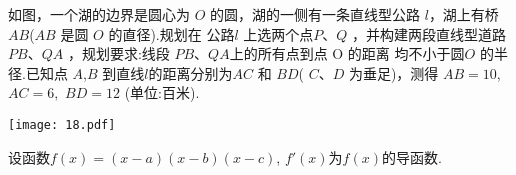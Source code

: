 \documentclass[no-math,twoside]{exam}  %
\newcommand\set[1]{\left\{\rule{0cm}{1.7ex} {#1} \right\}}
\begin{document}
\begin{questions}
{{\vfill


{

\begin{minipage}[t]{0.65\textwidth}
\linespread{1.4}\selectfont	
 	{\CTEXindent
	如图，一个湖的边界是圆心为 $O$ 的圆，湖的一侧有一条直线型公路 $l $，湖上有桥 $AB$($AB$ 是圆 $O$ 的直径).规划在 公路$ l$ 上选两个点$ P$、$Q$ ，并构建两段直线型道路 $PB$、$QA$ ，规划要求:线段 $PB$、$QA $上的所有点到点 O 的距离 均不小于圆$ O$ 的半径.已知点 $A$,$B$ 到直线$ l $的距离分别为$ AC$ 和 $BD $( $C$、$D$ 为垂足)，测得
$AB = 10$, $AC = 6,$ $BD = 12$ (单位:百米).

	}
\end{minipage} \quad
\begin{minipage}[t]{0.35\textwidth}
\vspace{-8pt}
	{\texttt{[image: 18.pdf]}}%
\end{minipage}


\vfill


\newpage

	
	{\CTEXindent
	设函数$f(x)=(x-a)(x-b)(x-c)$, $f'(x)$为$f(x)$的导函数.
	}
	
}}}
\end{questions}
\end{document}
